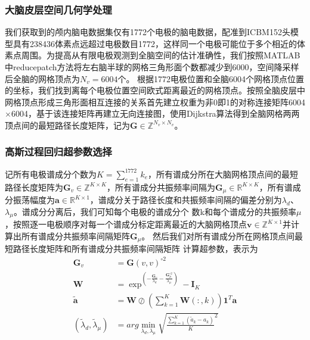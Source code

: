 \subsubsection{大脑皮层空间几何学处理}
我们获取到的颅内脑电数据集仅有1772个电极的脑电数据，配准到ICBM152头模型具有238436体素点远超过电极数目1772，这样同一个电极可能位于多个相近的体素点周围。为提高从有限电极观测到全脑空间的估计准确性，我们按照MATLAB中reducepatch方法将左右脑半球的网格三角形面个数都减少到6000，空间降采样后全脑的网格顶点为$N_v=6004$个。 根据1772电极位置和全脑6004个网格顶点位置的坐标，我们找到离每个电极位置空间欧式距离最近的网格顶点。按照全脑皮层中网格顶点形成三角形面相互连接的关系首先建立权重为非0即1的对称连接矩阵6004$\times$6004，基于该连接矩阵再建立无向连接图，使用Dijkstra算法得到全脑网格两两顶点间的最短路径长度矩阵，记为$\mathbf{G}\in{\mathbb{Z}^{N_v\times{N_v}}}$。

\subsubsection{高斯过程回归超参数选择}
记所有电极谱成分个数为$K=\sum_{e=1}^{1772}k_e$，所有谱成分所在大脑网格顶点间的最短路径长度矩阵为$\mathbf{G}_v\in{\mathbb{Z}^{K\times{K}}}$，所有谱成分共振频率间隔为$\mathbf{G}_\mu\in{\mathbb{R}^{K\times{K}}}$，所有谱成分振荡幅度为$\mathbf{a}\in{\mathbb{R}^{K\times1}}$，谱成分关于路径长度和共振频率间隔的偏差分别为$\lambda_d$、$\lambda_\mu$。谱成分分离后，我们可知每个电极的谱成分个
数k和每个谱成分的共振频率$\mu$，按照逐一电极顺序对每一个谱成分标定距离最近的大脑网格顶点$\mathbf{v}\in{\mathbb{Z}^{K\times1}}$并计算出所有谱成分共振频率间隔矩阵$\mathbf{G}_\mu$。 然后我们对所有谱成分所在网格顶点间最短路径长度矩阵和所有谱成分共振频率间隔矩阵
计算超参数，表示为
\begin{equation}\label{eq7.15}
\begin{aligned}
\mathbf{G}_v& = \mathbf{G}(v,v)^{\circ2}\\
\mathbf{W}& =\exp^{(-\frac{\mathbf{G}_v}{\lambda_d}-\frac{\mathbf{G}_\mu^{\circ2}}{\lambda_\mu})}-\mathbf{I}_K\\
\tilde{\mathbf{a}}& =\mathbf{W}\oslash{(\sum_{k=1}^K\mathbf{W}(:,k))\mathbf{1}^T}\mathbf{a}\\
(\tilde{\lambda}_d,\tilde{\lambda}_\mu)& =arg\min_{\lambda_d,\lambda_\mu}\sqrt{{\frac{\sum_{k=1}^{K}(\tilde{a}_k-a_k)}{K}}^2}
\end{aligned}
\end{equation}

